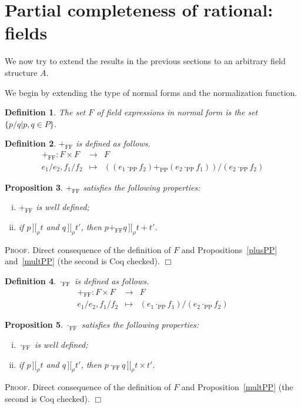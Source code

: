 \documentclass{article}
\newtheorem{definition}{Definition}[section]
\newtheorem{proposition}[definition]{Proposition}
\newenvironment{proof}{\smallskip\textsc{Proof.}}{\hspace*{\fill}$\Box$}
\newcommand{\intII}{\,]\![}
\newcommand{\intrel}{\mathbin{\intII_{\rho}}}
\newcommand{\tacticname}[1]{\textsf{#1}}
\newcommand{\rational}{\tacticname{rational}}
\newcommand{\plusPP}{\ensuremath{+_{\mathrm{PP}}}}
\newcommand{\multPP}{\ensuremath{\cdot_{\mathrm{PP}}}}
\newcommand{\plusFF}{\ensuremath{+_{\mathrm{FF}}}}
\newcommand{\multFF}{\ensuremath{\cdot_{\mathrm{FF}}}}
\begin{document}
\section{Partial completeness of {\rational}: fields}\label{fields}

We now try to extend the results in the previous sections to an
arbitrary field structure $A$.

We begin by extending the type of normal forms and the normalization function.

\begin{definition}\label{defn:NF} The set $F$ of field expressions in
normal form is the set $\{p/q|p,q\in P\}$.
\end{definition}

\begin{definition}\label{defn:plusFF} {\plusFF} is defined as follows.
\begin{eqnarray*}
\plusFF : F\times F & \to & F \\
 e_1/e_2, f_1/f_2 & \mapsto &
 \left((e_1\multPP f_2)\plusPP(e_2\multPP f_1)\right)/(e_2\multPP f_2)
\end{eqnarray*}
\end{definition}

\begin{proposition}\label{plusFF}
{\plusFF} satisfies the following properties:
\begin{enumerate}[(i)]
\item {\plusFF} is well defined;
\item if $p\intrel t$ and $q\intrel t'$, then $p\plusFF q\intrel t+t'$.
\end{enumerate}
\end{proposition}
\begin{proof}
Direct consequence of the definition of $F$ and Propositions~\ref{plusPP}
and~\ref{multPP} (the second is Coq checked).
\end{proof}

\begin{definition}\label{defn:multFF} {\multFF} is defined as follows.
\begin{eqnarray*}
\plusFF : F\times F & \to & F \\
 e_1/e_2, f_1/f_2 & \mapsto & (e_1\multPP f_1)/(e_2\multPP f_2)
\end{eqnarray*}
\end{definition}

\begin{proposition}\label{multFF}
{\multFF} satisfies the following properties:
\begin{enumerate}[(i)]
\item {\multFF} is well defined;
\item if $p\intrel t$ and $q\intrel t'$, then $p\multFF q\intrel t\times t'$.
\end{enumerate}
\end{proposition}
\begin{proof}
Direct consequence of the definition of $F$ and Proposition~\ref{multPP}
(the second is Coq checked).
\end{proof}
\end{document}
